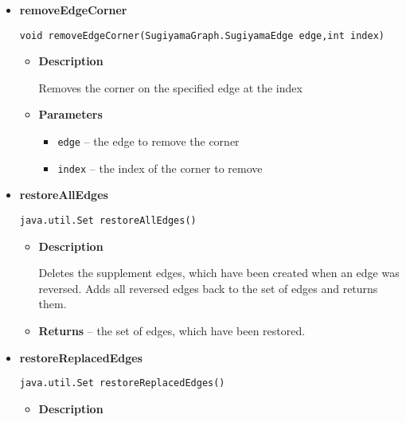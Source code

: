 {{{{{{{{{\begin{itemize}
{\begin{itemize}
{Returns the set of all with \texttt{\small reverseEdge(E edge)} reversed edges.
}
\item{{\bf  Returns} -- 
the set of all reversed edges. 
}%
\end{itemize}
}%
\item{ 
{\bf  removeEdgeCorner}\\
\begin{lstlisting}[frame=none]
void removeEdgeCorner(SugiyamaGraph.SugiyamaEdge edge,int index)\end{lstlisting} %
\begin{itemize}
\item{
{\bf  Description}

Removes the corner on the specified edge at the index
}
\item{
{\bf  Parameters}
  \begin{itemize}
   \item{
\texttt{edge} -- the edge to remove the corner}
   \item{
\texttt{index} -- the index of the corner to remove}
  \end{itemize}
}%
\end{itemize}
}%
\item{ 
{\bf  restoreAllEdges}\\
\begin{lstlisting}[frame=none]
java.util.Set restoreAllEdges()\end{lstlisting} %
\begin{itemize}
\item{
{\bf  Description}

Deletes the supplement edges, which have been created when an edge was reversed. Adds all reversed edges back to the set of edges and returns them.
}
\item{{\bf  Returns} -- 
the set of edges, which have been restored. 
}%
\end{itemize}
}%
\item{ 
{\bf  restoreReplacedEdges}\\
\begin{lstlisting}[frame=none]
java.util.Set restoreReplacedEdges()\end{lstlisting} %
\begin{itemize}
\item{
{\bf  Description}

}
\end{itemize}}
\end{itemize}}}}}}}}}}
